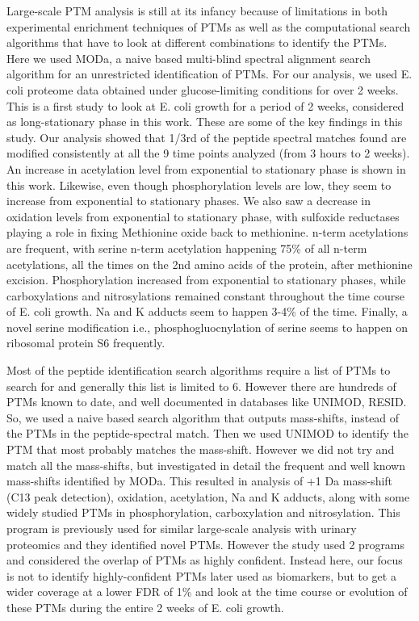 \documentclass[12pt]{article}
\begin{document}
Large-scale PTM analysis is still at its infancy because of limitations in both experimental enrichment techniques of PTMs as well as the computational search algorithms that have to look at different combinations to identify the PTMs. Here we used MODa, a naive based multi-blind spectral alignment search algorithm for an unrestricted identification of PTMs. For our analysis, we used E. coli proteome data obtained under glucose-limiting conditions for over 2 weeks. This is a first study to look at E. coli growth for a period of 2 weeks, considered as long-stationary phase in this work. These are some of the key findings in this study. Our analysis showed that 1/3rd of the peptide spectral matches found are modified consistently at all the 9 time points analyzed (from 3 hours to 2 weeks). An increase in acetylation level from exponential to stationary phase is shown in this work. Likewise, even though phosphorylation levels are low, they seem to increase from exponential to stationary phases. We also saw a decrease in oxidation levels from exponential to stationary phase, with sulfoxide reductases playing a role in fixing Methionine oxide back to methionine. n-term acetylations are frequent, with serine n-term acetylation happening 75\% of all n-term acetylations, all the times on the 2nd amino acids of the protein, after methionine excision. Phosphorylation increased from exponential to stationary phases, while carboxylations and nitrosylations remained constant throughout the time course of E. coli growth. Na and K adducts seem to happen 3-4\% of the time. Finally, a novel serine modification i.e., phosphogluocnylation of serine seems to happen on ribosomal protein S6 frequently.

Most of the peptide identification search algorithms require a list of PTMs to search for and generally this list is limited to 6. However there are hundreds of PTMs known to date, and well documented in databases like UNIMOD, RESID. So, we used a naive based search algorithm that outputs mass-shifts, instead of the PTMs in the peptide-spectral match. Then we used UNIMOD to identify the PTM that most probably matches the mass-shift. However we did not try and match all the mass-shifts, but investigated in detail the frequent and well known mass-shifts identified by MODa. This resulted in analysis of +1 Da mass-shift (C13 peak detection), oxidation, acetylation, Na and K adducts, along with some widely studied PTMs in phosphorylation, carboxylation and nitrosylation. This program is previously used for similar large-scale analysis with urinary proteomics and they identified novel PTMs. However the study used 2 programs and considered the overlap of PTMs as highly confident. Instead here, our focus is not to identify highly-confident PTMs later used as biomarkers, but to get a wider coverage at a lower FDR of 1\% and look at the time course or evolution of these PTMs during the entire 2 weeks of E. coli growth.
\end{document}
